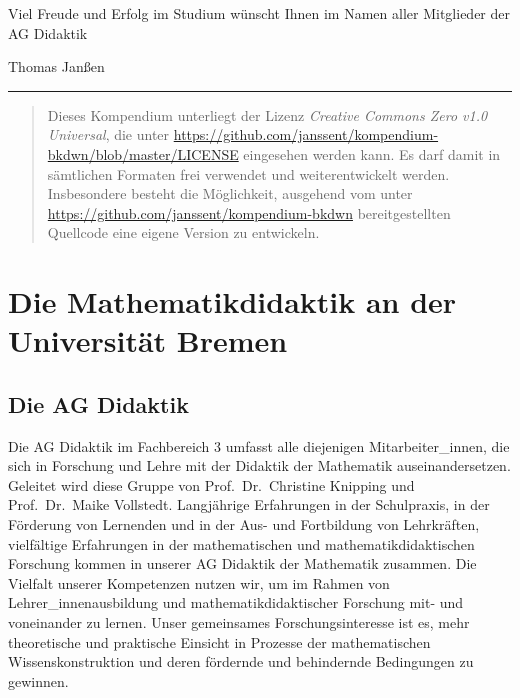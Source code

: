\documentclass[ngerman,bibliography=totoc,oneside,12pt,a4paper]{scrbook}
\begin{document}
Viel Freude und Erfolg im Studium wünscht Ihnen im Namen aller
Mitglieder der AG Didaktik

Thomas Janßen

\begin{center}\rule{0.5\linewidth}{\linethickness}\end{center}

\begin{quote}
Dieses Kompendium unterliegt der Lizenz \emph{Creative Commons Zero v1.0
Universal}, die unter
\url{https://github.com/janssent/kompendium-bkdwn/blob/master/LICENSE}
eingesehen werden kann. Es darf damit in sämtlichen Formaten frei
verwendet und weiterentwickelt werden. Insbesondere besteht die
Möglichkeit, ausgehend vom unter
\url{https://github.com/janssent/kompendium-bkdwn} bereitgestellten
Quellcode eine eigene Version zu entwickeln.
\end{quote}

\chapter{Die Mathematikdidaktik an der Universität
Bremen}\label{die-mathematikdidaktik-an-der-universitat-bremen}

\section{Die AG Didaktik}\label{die-ag-didaktik}

Die AG Didaktik im Fachbereich 3 umfasst alle diejenigen
Mitarbeiter\_innen, die sich in Forschung und Lehre mit der Didaktik der
Mathematik auseinandersetzen. Geleitet wird diese Gruppe von
Prof.~Dr.~Christine Knipping und Prof.~Dr.~Maike Vollstedt. Langjährige
Erfahrungen in der Schulpraxis, in der Förderung von Lernenden und in
der Aus- und Fortbildung von Lehrkräften, vielfältige Erfahrungen in der
mathematischen und mathematikdidaktischen Forschung kommen in unserer AG
Didaktik der Mathematik zusammen. Die Vielfalt unserer Kompetenzen
nutzen wir, um im Rahmen von Lehrer\_innenausbildung und
mathematikdidaktischer Forschung mit- und voneinander zu lernen. Unser
gemeinsames Forschungsinteresse ist es, mehr theoretische und praktische
Einsicht in Prozesse der mathematischen Wissenskonstruktion und deren
fördernde und behindernde Bedingungen zu gewinnen.
\end{document}
